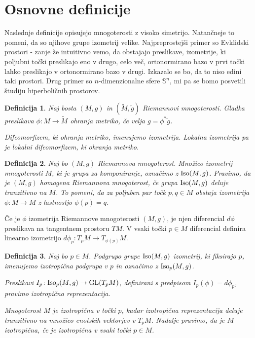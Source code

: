 \documentclass[a4paper]{article}
\newtheorem{definicija}{Definicija}
\begin{document}
\section{Osnovne definicije}

Naslednje definicije opisujejo mnogoterosti z visoko simetrijo. Natančneje to pomeni, da so njihove grupe izometrij velike. Najpreprostejši primer so Evklidski prostori - zanje že intuitivno vemo, da obstajajo preslikave, izometrije, ki poljubni točki preslikajo eno v drugo, celo več, ortonormirano bazo v prvi točki lahko preslikajo v ortonormirano bazo v drugi. Izkazalo se bo, da to niso edini taki prostori. Drug primer so $n$-dimenzionalne sfere $\mathbb{S}^{n}$, mi pa se bomo posvetili študiju hiperboličnih prostorov.

\begin{definicija}
Naj bosta $(M,g)$ in $(\tilde{M}, \tilde{g})$ Riemannovi mnogoterosti. Gladka preslikava $\phi \colon M \to \tilde{M}$ \emph{ohranja metriko}, če velja $g = \phi^{*}\tilde{g}$.

Difeomorfizem, ki ohranja metriko, imenujemo \emph{izometrija}. \emph{Lokalna izometrija} pa je lokalni difeomorfizem, ki ohranja metriko. 
\end{definicija}

\begin{definicija}
Naj bo $(M,g)$ Riemannova mnogoterost. Množico izometrij mnogoterosti $M$, ki je grupa za komponiranje, označimo z $\textup{Iso}(M,g)$.
Pravimo, da je $(M,g)$ \emph{homogena Riemannova mnogoterost}, če grupa $\textup{Iso}(M,g)$ deluje tranzitivno na $M$. To pomeni, da za poljuben par točk $p,q \in M$ obstaja izometrija $\phi \colon M \to M$ z lastnostjo $\phi(p)=q$.
\end{definicija}

Če je $\phi$ izometrija Riemannove mnogoterosti $(M,g)$, je njen diferencial $d\phi$ preslikava na tangentnem prostoru $TM$. V vsaki točki $p \in M$ diferencial definira linearno izometrijo $d\phi_{p} \colon T_{p}M \to T_{\phi(p)}M$.

\begin{definicija}
Naj bo $p \in M$. Podgrupo grupe $\textup{Iso}(M,g)$ izometrij, ki fiksirajo $p$, imenujemo \emph{izotropična podgrupa} v $p$ in označimo z 
$\textup{Iso}_{p}(M,g)$. 

Preslikavi $I_{p} \colon \textup{Iso}_{p}(M,g) \to \textup{GL}(T_{p}M)$, definirani s predpisom $I_{p}(\phi) = d\phi_{p}$, pravimo \emph{izotropična reprezentacija}.

Mnogoterost $M$ je \emph{izotropična v točki $p$}, kadar izotropična reprezentacija deluje tranzitivno na množico enotskih vektorjev v $T_{p}M$. Nadalje pravimo, da je $M$ \emph{izotropična}, če je izotropična v vsaki točki $p \in M$.
\end{definicija}
\end{document}
